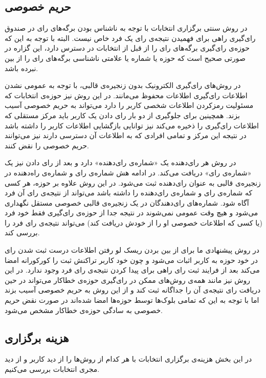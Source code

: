 \subsection{حریم خصوصی}
در روش سنتی برگزاری انتخابات با توجه به ناشناس بودن برگه‌های رای در صندوق رای‌گیری راهی برای فهمیدن نتیجه‌ی رای‌ یک فرد خاص نیست. البته با توجه به این که حوزه‌ی رای‌گیری برگه‌های رای را از قبل از انتخابات در دسترس دارد، این گزاره در صورتی صحیح است که حوزه یا شماره یا علامتی ناشناسی برگه‌های رای را از بین نبرده باشد.
\par 
در روش‌های رای‌گیری الکترونیک بدون زنجیره‌ی قالبی، با توجه به عمومی نشدن اطلاعات رای‌گیری اطلاعات محفوظ می‌مانند. در این روش نیز حوزه‌ی انتخابات که مسئولیت رمزکردن اطلاعات شخصی کاربر را دارد می‌تواند به حریم خصوصی آسیب بزند. همچینین برای جلوگیری از دو بار رای دادن یک کاربر باید مرکز مستقلی که اطلاعات رای‌گیری را ذخیره می‌کند نیز توانایی بازگشایی اطلاعات کاربر را داشته باشد در نتیجه این مرکز و تمامی افرادی که به اطلاعات آن دسترسی دارند نیز می‌توانند حریم خصوصی را نقض کنند. 
\par
در روش  هر رای‌دهنده یک «شماره‌ی رای‌دهنده» دارد و بعد از رای دادن نیز یک «شماره‌ی رای» دریافت می‌کند. در ادامه هش شماره‌ی رای و شماره‌ی راه‌دهنده در زنجیره‌ی قالبی به عنوان رای‌دهنده ثبت می‌شود. در این روش علاوه بر حوزه، هر کسی که شماره‌ی رای و شماره‌ی رای‌دهنده را داشته باشد می‌تواند از نتیجه‌ی رای آن فرد آگاه شود. شماره‌های رای‌دهندگان در یک زنجیره‌ی قالبی خصوصی مستقل نگهداری می‌شود و هیچ وقت عمومی نمی‌شوند در نتیجه جدا از حوزه‌ی رای‌گیری فقط خود فرد (یا کسی که اطلاعات خصوصی او را از خودش دریافت کند) می‌تواند نتیجه‌ی رای فرد را بررسی کند. 
\par 
در روش پیشنهادی ما برای از بین بردن ریسک لو رفتن اطلاعات درست ثبت شدن رای در خود حوزه به کاربر اثبات می‌شود و چون خود کاربر تراکنش ثبت را کورکورانه امضا می‌کند بعد از فرایند ثبت رای راهی برای پیدا کردن نتیجه‌ی رای فرد وجود ندارد. در این روش نیز مانند همه‌ی روش‌های ممکن در رای‌گیری حوزه‌ی خطاکار می‌تواند در حین دریافت رای نتیجه‌ی آن را جداگانه ثبت کند و از این روش به حریم خصوصی آسیب بزند اما با توجه به این که تمامی بلوک‌ها توسط حوزه‌ها امضا شده‌اند در صورت نقض حریم خصوصی به سادگی حوزه‌ی خطاکار مشخص می‌شود.

\subsection{هزینه برگزاری}
در این بخش هزینه‌ی برگزاری انتخابات با هر کدام از روش‌ها را از دید کاربر و از دید مجری انتخابات بررسی می‌کنیم.
